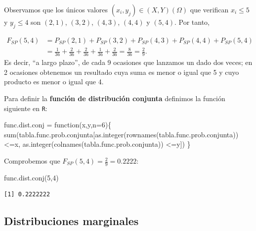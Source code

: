 \documentclass[
  letterpaper,
  DIV=11,
  numbers=noendperiod]{scrreprt}
\newenvironment{Shaded}{\begin{snugshade}}{\end{snugshade}}
\newcommand{\AttributeTok}[1]{\textcolor[rgb]{0.40,0.45,0.13}{#1}}
\newcommand{\ControlFlowTok}[1]{\textcolor[rgb]{0.00,0.23,0.31}{#1}}
\newcommand{\DecValTok}[1]{\textcolor[rgb]{0.68,0.00,0.00}{#1}}
\newcommand{\FunctionTok}[1]{\textcolor[rgb]{0.28,0.35,0.67}{#1}}
\newcommand{\NormalTok}[1]{\textcolor[rgb]{0.00,0.23,0.31}{#1}}
\newcommand{\OtherTok}[1]{\textcolor[rgb]{0.00,0.23,0.31}{#1}}
\newcommand{\SpecialCharTok}[1]{\textcolor[rgb]{0.37,0.37,0.37}{#1}}
\begin{document}
Observamos que los únicos valores \((x_i,y_j)\in (X,Y)(\Omega)\) que
verifican \(x_i\leq 5\) y \(y_j\leq 4\) son \((2,1)\), \((3,2)\),
\((4,3)\), \((4,4)\) y \((5,4)\). Por tanto,

\[
\begin{array}{rl}
F_{SP}(5,4) &= P_{SP}(2,1)+P_{SP}(3,2)+P_{SP}(4,3)+P_{SP}(4,4)+P_{SP}(5,4) \\ & = \frac{1}{36}+\frac{2}{36}+\frac{2}{36}+\frac{1}{36}+\frac{2}{36} = \frac{8}{36}=\frac{2}{9}.
\end{array}
\] Es decir, ``a largo plazo'', de cada 9 ocasiones que lanzamos un dado
dos veces; en 2 ocasiones obtenemos un resultado cuya suma es menor o
igual que 5 y cuyo producto es menor o igual que 4.

Para definir la \textbf{función de distribución conjunta} definimos la
función siguiente en \texttt{R}:

\begin{Shaded}
\begin{Highlighting}[]
\NormalTok{func.dist.conj }\OtherTok{=} \ControlFlowTok{function}\NormalTok{(x,y,}\AttributeTok{n=}\DecValTok{6}\NormalTok{)\{}
  \FunctionTok{sum}\NormalTok{(tabla.func.prob.conjunta[}\FunctionTok{as.integer}\NormalTok{(}\FunctionTok{rownames}\NormalTok{(tabla.func.prob.conjunta))}\SpecialCharTok{\textless{}=}\NormalTok{x,}
                            \FunctionTok{as.integer}\NormalTok{(}\FunctionTok{colnames}\NormalTok{(tabla.func.prob.conjunta)) }\SpecialCharTok{\textless{}=}\NormalTok{y])}
\NormalTok{\}}
\end{Highlighting}
\end{Shaded}

Comprobemos que \(F_{SP}(5,4)=\frac{2}{9}=0.2222\):

\begin{Shaded}
\begin{Highlighting}[]
\FunctionTok{func.dist.conj}\NormalTok{(}\DecValTok{5}\NormalTok{,}\DecValTok{4}\NormalTok{)}
\end{Highlighting}
\end{Shaded}

\begin{verbatim}
[1] 0.2222222
\end{verbatim}

\hypertarget{distribuciones-marginales}{%
\subsection{Distribuciones marginales}\label{distribuciones-marginales}}
\end{document}
